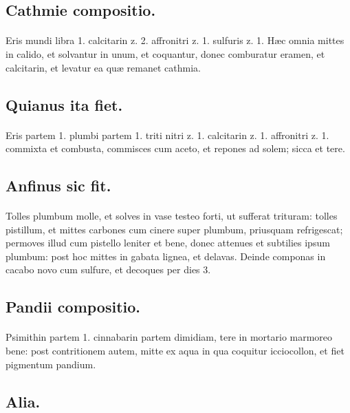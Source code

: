 \documentclass[a4paper, 11pt, oneside, polutonikogreek, italian]{article}
\begin{document}
\subsection{Cathmie compositio.}
\paragraph{}
Eris mundi libra 1. calcitarin z. 2. affronitri z. 1. sulfuris z. 1. Hæc omnia mittes in calido, et solvantur in unum, et coquantur, donec comburatur eramen, et calcitarin, et levatur ea quæ remanet cathmia.

\subsection{Quianus ita fiet.}
\paragraph{}
Eris partem 1. plumbi partem 1. triti nitri z. 1. calcitarin z. 1. affronitri z. 1. commixta et combusta, commisces cum aceto, et repones ad solem; sicca et tere.

\subsection{Anfinus sic fit.}
\paragraph{}
Tolles plumbum molle, et solves in vase testeo forti, ut sufferat trituram: tolles pistillum, et mittes carbones cum cinere super plumbum, priusquam refrigescat; permoves illud cum pistello leniter et bene, donec attenues et subtilies ipsum plumbum: post hoc mittes in gabata lignea, et delavas. Deinde componas in cacabo novo cum sulfure, et decoques per dies 3.

\subsection{Pandii compositio.}
\paragraph{}
Psimithin partem 1. cinnabarin partem dimidiam, tere in mortario marmoreo bene: post contritionem autem, mitte ex aqua in qua coquitur icciocollon, et fiet pigmentum pandium.

\subsection{Alia.}
\end{document}
